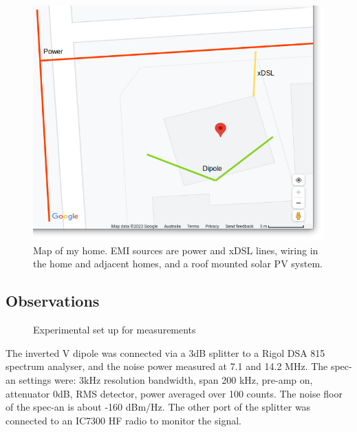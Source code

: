 \documentclass{article}
\begin{document}
\begin{figure}[h]
\caption{Map of my home.  EMI sources are power and xDSL lines, wiring in the home and adjacent homes, and a roof mounted solar PV system.}
\label{fig:home_map}
\begin{center}
\includegraphics[width=12cm]{house_map.png}
\end{center}
\end{figure}

\subsection{Observations}

\begin{figure}[h]
\caption{Experimental set up for measurements}
\label{fig:meas_config_1}
\begin{center}
\end{center}
\end{figure}

The inverted V dipole was connected via a 3dB splitter to a Rigol DSA 815 spectrum analyser, and the noise power measured at 7.1 and 14.2 MHz.  The spec-an settings were: 3kHz resolution bandwidth, span 200 kHz, pre-amp on, attenuator 0dB, RMS detector, power averaged over 100 counts.  The noise floor of the spec-an is about -160 dBm/Hz. The other port of the splitter was connected to an IC7300 HF radio to monitor the signal.
\end{document}
